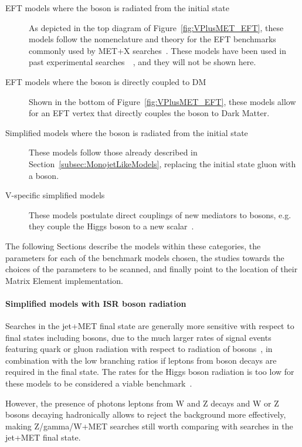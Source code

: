 \begin{description}
 \item[EFT models where the boson is radiated from the initial state] As depicted in 
 the top diagram of Figure~\ref{fig:VPlusMET_EFT}, these  models follow the nomenclature and theory 
 for the EFT benchmarks commonly used by MET+X searches~\citep{Goodman:2010ku}. These models
 have been used in past experimental searches~~\citep{Khachatryan:2014rwa, Aad:2014vka,Khachatryan:2014tva, Aad:2014vka, 
 ATLAS:2014wra,Aad:2013oja}, and they will not be shown here. 
 \item[EFT models where the boson is directly coupled to DM] Shown in the bottom of Figure~\ref{fig:VPlusMET_EFT},
 these models allow for an EFT vertex that directly couples the boson to Dark Matter. 
 \item[Simplified models where the boson is radiated from the initial state] These models follow those
 already described in Section~\ref{subsec:MonojetLikeModels}, replacing the initial state gluon with a boson.
 \item[V-specific simplified models] These models postulate direct couplings of new mediators
 to bosons, e.g. they couple the Higgs boson to a new scalar~\citep{Carpenter:2013xra}. 
\end{description}

The following Sections describe the models within these categories, 
the parameters for each of the benchmark models chosen,
the studies towards the choices of the parameters to be scanned, 
and finally point to the location of their Matrix Element 
implementation. 

\paragraph{Simplified models with ISR boson radiation}

Searches in the jet+MET final state are generally more sensitive
with respect to final states including bosons, due to the much 
larger rates of signal events featuring quark or gluon radiation with 
respect to radiation of bosons~\citep{Zhou:2013fla}, 
in combination with the low branching ratios if leptons from 
boson decays are required in the final state. 
The rates for the Higgs boson radiation is too low for these models 
to be considered a viable benchmark~\citep{Carpenter:2013xra}.

However, the presence of photons
leptons from W and Z decays
and W or Z bosons decaying hadronically
allows to reject the background more effectively, making Z/gamma/W+MET searches 
still worth comparing with searches in the jet+MET final state. 

